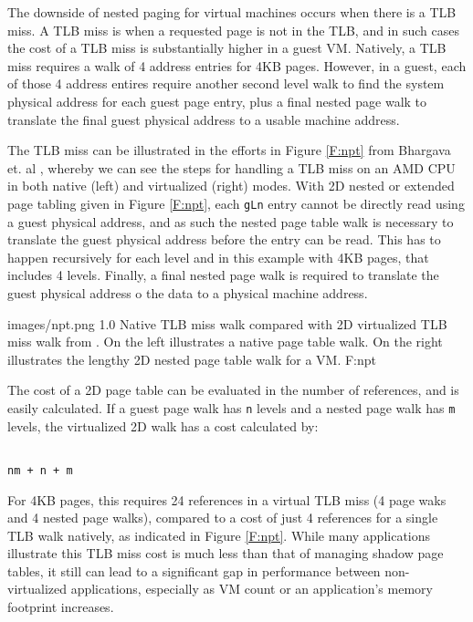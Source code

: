 The downside of nested paging for virtual machines occurs when there is a TLB miss. A TLB miss is when a requested page is not in the TLB, and in such cases the cost of a TLB miss is substantially higher in a guest VM. Natively, a TLB miss requires a walk of 4 address entries for 4KB pages. However, in a guest, each of those 4 address entires require another second level walk to find the system physical address for each guest page entry, plus a final nested page walk to translate the final guest physical address to a usable machine address.  

The TLB miss can be illustrated in the efforts in Figure \ref{F:npt} from Bhargava et. al \cite{bhargava2008npt}, whereby we can see the steps for handling a TLB miss on an AMD CPU in both native (left) and virtualized (right) modes. With 2D nested or extended page tabling given in Figure \ref{F:npt}, each \verb|gLn| entry cannot be directly read using a guest physical address, and as such the nested page table walk is necessary to translate the guest physical address before the entry can be read. This has to happen recursively for each level and in this example with 4KB pages, that includes 4 levels. Finally, a final nested page walk is required to translate the guest physical address o the data to a physical machine address.  

  {images/npt.png}
  {1.0}
  {Native TLB miss walk compared with 2D virtualized TLB miss walk from \cite{bhargava2008npt}. On the left illustrates a native page table walk. On the right illustrates the lengthy 2D nested page table walk for a VM.}
  {F:npt}


The cost of a 2D page table can be evaluated in the number of references, and is easily calculated. If a guest page walk has \verb|n| levels and a nested page walk has \verb|m| levels, the virtualized 2D walk has a cost calculated by:
 
\begin{verbatim}

nm + n + m
\end{verbatim}


For 4KB pages, this requires 24 references in a virtual TLB miss (4 page waks and 4 nested page walks), compared to a cost of just 4 references for a single TLB walk natively, as indicated in Figure \ref{F:npt}. While many applications illustrate this TLB miss cost is much less than that of managing shadow page tables, it still can lead to a significant gap in performance between non-virtualized applications, especially as VM count or an application's memory footprint increases. 

